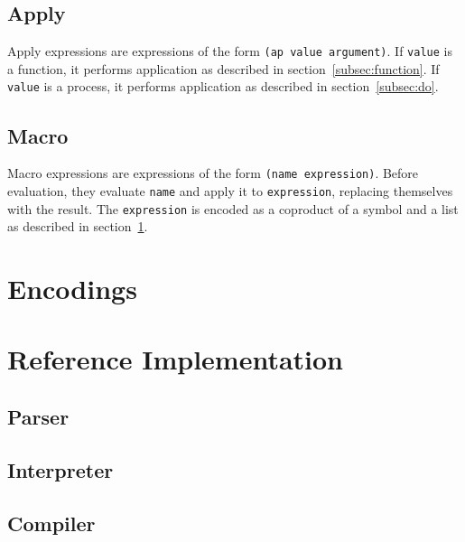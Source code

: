 \documentclass{article}
\begin{document}
\begin{multicols}{2}
        \subsection{Apply}\label{subsec:apply}

        Apply expressions are expressions of the form \lstinline$(ap value argument)$.
        If \lstinline$value$ is a function, it performs application as described in section~\ref{subsec:function}.
        If \lstinline$value$ is a process, it performs application as described in section~\ref{subsec:do}.
        \newline

        \subsection{Macro}\label{subsec:macro}

        Macro expressions are expressions of the form \lstinline$(name expression)$.
        Before evaluation, they evaluate \lstinline$name$ and apply it to \lstinline$expression$, replacing themselves with the result.
        The \lstinline$expression$ is encoded as a coproduct of a symbol and a list as described in section~\ref{sec:encodings}.
        \newline
    \end{multicols}
    \newpage

    \section{Encodings}\label{sec:encodings}

    \begin{multicols*}{2}
        
    \end{multicols*}
    \newpage

    \section{Reference Implementation}\label{sec:implementation}

    \subsection{Parser}\label{subsec:parser}

    

    \subsection{Interpreter}\label{subsec:interpreter}

    

    \subsection{Compiler}\label{subsec:compiler}

    
\end{document}
